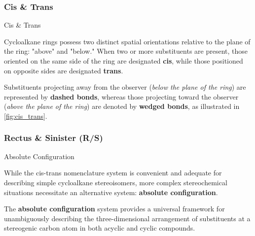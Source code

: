 \documentclass[10pt]{article}
\begin{document}
    \subsubsection{Cis \& Trans}

      \begin{core}{Cis \& Trans}

        Cycloalkane rings possess two distinct spatial orientations relative to the plane of the ring: "above" and "below." When two or more substituents are present, those oriented on the same side of the ring are designated \textbf{cis}, while those positioned on opposite sides are designated \textbf{trans}.


        Substituents projecting away from the observer (\textit{below the plane of the ring}) are represented by \textbf{dashed bonds}, whereas those projecting toward the observer (\textit{above the plane of the ring}) are denoted by \textbf{wedged bonds}, as illustrated in \autoref{fig:cis_trans}.

      \end{core}

    \subsubsection{Rectus \& Sinister (R/S)}

      \begin{core}[label=core:abs_config]{Absolute Configuration}

        While the cis-trans nomenclature system is convenient and adequate for describing simple cycloalkane stereoisomers, more complex stereochemical situations necessitate an alternative system: \textbf{absolute configuration}.

        The \textbf{absolute configuration} system provides a universal framework for unambiguously describing the three-dimensional arrangement of substituents at a stereogenic carbon atom in both acyclic and cyclic compounds.

      \end{core}
\end{document}
